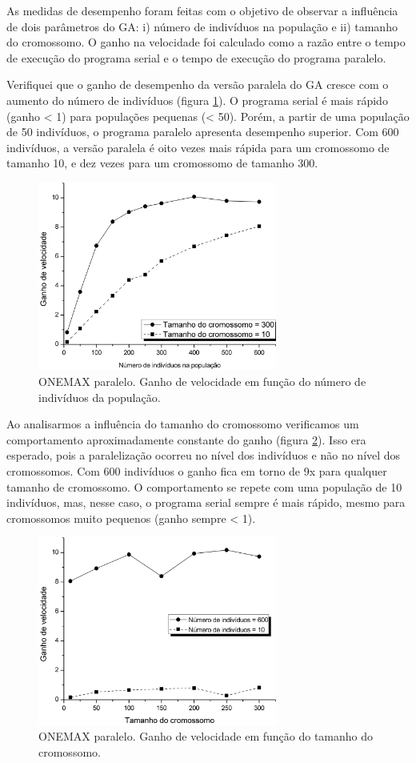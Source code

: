 	As medidas de desempenho foram feitas com o objetivo de observar a influência de dois parâmetros do GA: i) número de indivíduos na população e ii) tamanho do cromossomo. O ganho na velocidade foi calculado como a razão entre o tempo de execução do programa serial e o tempo de execução do programa paralelo.

Verifiquei que o ganho de desempenho da versão paralela do GA cresce com o aumento do número de indivíduos (figura \ref{fig:ganhoNumInd}). O programa serial é mais rápido (ganho < 1) para populações pequenas (< 50). Porém, a partir de uma população de 50 indivíduos, o programa paralelo apresenta desempenho superior. Com 600 indivíduos, a versão paralela é oito vezes mais rápida para um cromossomo de tamanho 10, e dez vezes para um cromossomo de tamanho 300. 

\begin{figure}[htbp]
	\centering
		\includegraphics[width=0.70\textwidth]{figs/resultados/onemax/ganhoNumInd.png}
	\caption{ONEMAX paralelo. Ganho de velocidade em função do número de indivíduos da população.}
	\label{fig:ganhoNumInd}
\end{figure}

	Ao analisarmos a influência do tamanho do cromossomo verificamos um comportamento aproximadamente constante do ganho (figura \ref{fig:ganhoTamCromo}). Isso era esperado, pois a paralelização ocorreu no nível dos indivíduos e não no nível dos cromossomos. Com 600 indivíduos o ganho fica em torno de 9x para qualquer tamanho de cromossomo. O comportamento se repete com uma população de 10 indivíduos, mas, nesse caso, o programa serial sempre é mais rápido, mesmo para cromossomos muito pequenos (ganho sempre < 1). 
		
	\begin{figure}[htbp]
		\centering
			\includegraphics[width=0.70\textwidth]{figs/resultados/onemax/ganhoTamCromo.png}
		\caption{ONEMAX paralelo. Ganho de velocidade em função do tamanho do cromossomo.}
		\label{fig:ganhoTamCromo}
	\end{figure}